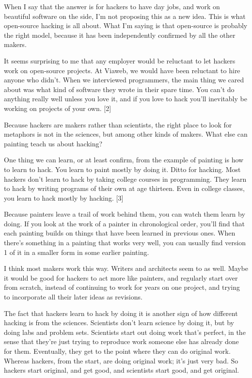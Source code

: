 When I say that the answer is for hackers to have day jobs, 
and work on beautiful software on the side, I'm not proposing
this as a new idea.  This is what open-source hacking is all   
about.  What I'm saying is that open-source is probably the right
model, because it has been independently confirmed by all the  
other makers.

It seems surprising to me that any employer would be reluctant
to let hackers work on open-source projects.
At Viaweb, we would have been reluctant to hire anyone
who didn't.  When we interviewed
programmers, the main
thing we cared about was what kind of software they
wrote in their spare time.
You can't do anything really well unless
you love it, and if you love to hack you'll inevitably
be working on projects of your own. [2]



Because hackers are makers rather than scientists,
the right place to look for metaphors is not in the
sciences, but among other kinds of makers.  What else can painting
teach us about hacking?

One thing we can learn, or at least confirm, from the
example of painting is how to learn to hack.  You learn to
paint mostly by doing it.
Ditto for hacking.  Most hackers don't learn to hack by
taking college courses in programming.  They learn to hack
by writing programs of their own at age thirteen.  Even in   
college classes, you learn to hack mostly by hacking. [3]

Because painters leave a trail of work behind them, you
can watch them learn by doing.  If you look at the work
of a painter in chronological order, you'll find that each  
painting builds on things that have been learned in previous
ones.  When there's something in
a painting that works very well, you can usually find version 
1 of it in a smaller form in some earlier painting.

I think most makers work this way.  Writers and architects seem
to as well.  Maybe it would be good for hackers
to act more like painters, and regularly start over from scratch,
instead of continuing to work for years on one project, and
trying to incorporate all their later ideas as revisions.

The fact that hackers learn to hack by doing it is another
sign of how different hacking is from the sciences.  Scientists
don't learn science by doing it, but by doing labs and problem sets.
Scientists start out doing work that's perfect, in the sense
that they're just trying to reproduce work someone else has 
already done for them.
Eventually, they get
to the point where they can do original work.
Whereas hackers, from the start, are doing original work; it's
just very bad.  So hackers start original, and get good, and
scientists start good, and get original.





